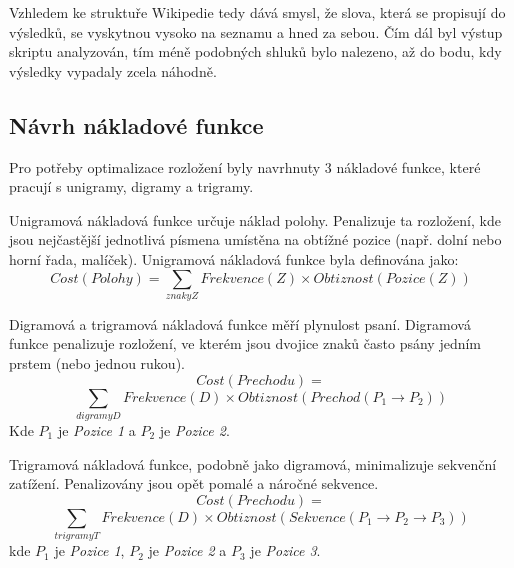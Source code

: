 \documentclass[a4paper, twoside, 12pt, czech]{article}
\begin{document}
Vzhledem ke struktuře Wikipedie tedy dává smysl, že slova, která se propisují do výsledků, 
se vyskytnou vysoko na seznamu a hned za sebou. Čím dál byl výstup skriptu analyzován, 
tím méně podobných shluků bylo nalezeno, až do bodu, kdy výsledky vypadaly zcela náhodně.




\subsection{Návrh nákladové funkce}
Pro potřeby optimalizace rozložení byly navrhnuty 3 nákladové funkce, které pracují s 
unigramy, digramy a trigramy. 

Unigramová nákladová funkce určuje náklad polohy. Penalizuje ta rozložení, kde jsou 
nejčastější jednotlivá písmena umístěna na obtížné pozice (např. dolní nebo horní řada, malíček).
Unigramová nákladová funkce byla definována jako:
\begin{equation*}
    Cost(Polohy) = \sum_{znaky Z} Frekvence(Z) \times Obtiznost(Pozice(Z))
\end{equation*}

Digramová a trigramová nákladová funkce měří plynulost psaní. Digramová funkce penalizuje 
rozložení, ve kterém jsou dvojice znaků často psány jedním prstem (nebo jednou rukou).
\begin{equation*}
    Cost(Prechodu) = 
\end{equation*}
\begin{equation*}
    \sum_{digramy D} Frekvence(D) \times Obtiznost(Prechod(P_1\rightarrow P_2))
\end{equation*}
Kde $P_1$ je \textit{Pozice 1} a $P_2$ je \textit{Pozice 2}.

Trigramová nákladová funkce, podobně jako digramová, minimalizuje sekvenční zatížení. Penalizovány 
jsou opět pomalé a náročné sekvence.
\begin{equation*}
    Cost(Prechodu) = 
\end{equation*}
\begin{equation*}
    \sum_{trigramy T} Frekvence(D) \times Obtiznost(Sekvence(P_1\rightarrow P_2\rightarrow P_3))
\end{equation*}
kde $P_1$ je \textit{Pozice 1}, $P_2$ je \textit{Pozice 2} a $P_3$ je \textit{Pozice 3}.
\end{document}
